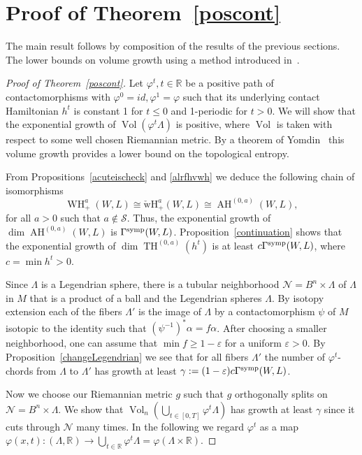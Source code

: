 \documentclass{amsart}
\newcommand{\Ncal}{{\mathcal{N}}}
\newcommand{\Scal}{{\mathcal{S}}}
\newcommand{\RR}{\mathbb{R}}
\newcommand{\Vol}{\operatorname{Vol}}
\renewcommand{\TH}{\operatorname{TH}}
\newcommand{\AH}{\operatorname{AH}}
\newcommand{\WslantH}{\operatorname{WH}}
\newcommand{\WcheckH}{\operatorname{\check wH}}
\theoremstyle{definition}
\theoremstyle{remark}
\numberwithin{equation}{section}
\begin{document}
\section{Proof of Theorem~\ref{poscont}}\label{sec:proof}

The main result follows by composition of the results of the previous sections. The lower bounds on volume growth using a method introduced in~\cite{A17}.

\begin{proof}[Proof of Theorem~\ref{poscont}]
	Let $\varphi^t, t\in\RR$ be a positive path of contactomorphisms with $\varphi^0=id,\varphi^1=\varphi$ such that its underlying contact Hamiltonian $h^t$  is constant 1 for $t\leq0$ and 1-periodic for $t>0$. We will show that the exponential growth of $\Vol(\varphi^t\Lambda)$ is positive, where $\Vol$ is taken with respect to some well chosen Riemannian metric. By a theorem of Yomdin~\cite{Y} this volume growth provides a lower bound on the topological entropy. 
	
From Propositions~\ref{acuteischeck} and \ref{alrfhvwh} we deduce the following chain of isomorphisms
$$\WslantH_+^a(W,L)\cong \WcheckH_+^a(W,L)\cong \AH^{(0,a)}(W,L),$$
for all $a>0$ such that $a\notin\Scal$. Thus, the exponential growth of $\dim\AH^{(0,a)}(W,L)$ is $\Gamma^{\rm symp}(W,L)$. Proposition~\ref{continuation} shows that the exponential growth of $\dim \TH^{(0,a)}(h^t)$ is at least $c\Gamma^{\rm symp}(W,L)$, where $c=\min h^t>0$. 

Since $\Lambda$ is a Legendrian sphere, there is a tubular neighborhood $\Ncal= B^{n}\times \Lambda$ of $\Lambda$ in $M$ that is a product of a ball and the Legendrian spheres $\Lambda$. By isotopy extension each of the fibers $\Lambda'$ is the image of $\Lambda$ by a contactomorphism $\psi$ of $M$ isotopic to the identity such that $(\psi^{-1})^*\alpha=f\alpha$. After choosing a smaller neighborhood, one can assume that $\min f\geq 1-\varepsilon$ for a uniform $\varepsilon>0$. By Proposition~\ref{changeLegendrian} we see that for all fibers $\Lambda'$ the number of $\varphi^t$-chords from $\Lambda$ to $\Lambda'$ has growth at least $\gamma:=(1-\varepsilon)c\Gamma^{\rm symp}(W,L)$.

Now we choose our Riemannian metric $g$ such that $g$ orthogonally splits on $\Ncal= B^{n}\times \Lambda$. We show that $\Vol_n(\bigcup_{t\in[0,T]} \varphi^t\Lambda)$ has growth at least $\gamma$ since it cuts through $\Ncal$ many times. In the following we regard $\varphi^t$ as a map $\varphi(x,t):(\Lambda,\RR)\to \bigcup_{t\in\RR} \varphi^t\Lambda=\varphi(\Lambda\times\RR)$.


\end{proof}
\end{document}
